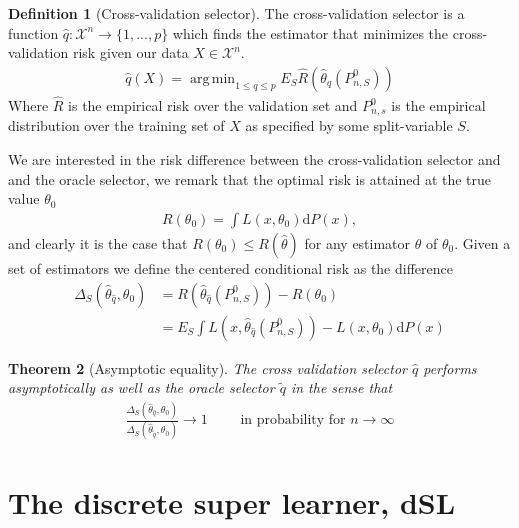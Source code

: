 \documentclass[11pt, a4paper]{article}
\DeclareMathOperator*{\argmin}{arg\,min}
\newtheorem{theorem}{Theorem}
\theoremstyle{definition}
\newtheorem{definition}[theorem]{Definition}
\theoremstyle{remark}
\newcommand{\cl}{q}
\begin{document}
\begin{definition}[Cross-validation selector]
    The cross-validation selector is a function $ \hat{\cl}: \mathcal{X}^{n} \to \{1,...,p\} $  which finds the estimator that minimizes the cross-validation risk given our data $ X \in \mathcal{X}^{n} $. 
    \begin{align*}
        \hat{\cl}(X) = \argmin_{1 \leq \cl \leq p} E_S \hat{R} ( \hat{\theta} _\cl (P_{n,S}^0 )) 
    \end{align*}
    Where $ \hat{R}  $ is the empirical risk over the validation set and $ P_{n ,s}^{0} $ is the empirical distribution over the training set of $ X $ as specified by some split-variable $ S $. 
\end{definition}
We are interested in the risk difference between the cross-validation selector and and the oracle selector, we remark that the optimal risk is attained at the true value $ \theta_0 $ 
\begin{align*}
    R(\theta_0) = \int L(x, \theta_0)  \mathrm{d}P(x),
\end{align*}
and clearly it is the case that $ R(\theta_0) \leq R( \hat{\theta}  ) $ for any estimator $ \hat{\theta} $ of $ \theta_0 $.
Given a set of estimators we define the centered conditional risk as the difference 
\begin{align*}
    \Delta_{S}( \hat{\theta}_{ \hat{\cl} }, \theta_0 ) &= R( \hat{\theta} _{ \hat{\cl} }(P_{n, S}^{0})) -R(\theta_0) \\
                                                       &= E_{S} \int L(x, \hat{\theta}_{ \hat{\cl} }(P_{n, S}^{0})) - L(x, \theta_0) \mathrm{d}P(x) 
\end{align*}

\begin{theorem}[Asymptotic equality]
    The cross validation selector $ \hat{\cl}  $ performs asymptotically as well as the oracle selector $ \tilde{\cl} $  in the sense that 
    \begin{align*}
        \frac{\Delta_{S}( \hat{\theta}_{ \hat{\cl} } , \theta_0 )}{ \Delta_{S}( \hat{\theta}_{ \tilde{\cl} } , \theta_0) } \to 1 \qquad \text{ in probability for } n \to \infty
    \end{align*}
\end{theorem}


\section{The discrete super learner, dSL}
\end{document}
